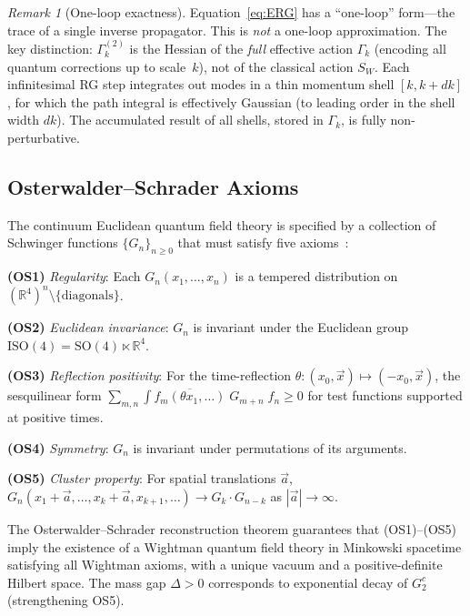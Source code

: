 \documentclass[12pt,a4paper]{article}
\theoremstyle{plain}
\theoremstyle{definition}
\theoremstyle{remark}
\newtheorem{remark}[theorem]{Remark}
\begin{document}
\begin{remark}[One-loop exactness]\label{rem:oneloop}
Equation~\eqref{eq:ERG} has a ``one-loop'' form---the trace of a single inverse propagator. This is \emph{not} a one-loop approximation. The key distinction: $\Gamma_k^{(2)}$ is the Hessian of the \emph{full} effective action $\Gamma_k$ (encoding all quantum corrections up to scale~$k$), not of the classical action $S_W$. Each infinitesimal RG step integrates out modes in a thin momentum shell $[k,k+dk]$, for which the path integral is effectively Gaussian (to leading order in the shell width $dk$). The accumulated result of all shells, stored in $\Gamma_k$, is fully non-perturbative.
\end{remark}

\subsection{Osterwalder--Schrader Axioms}\label{sec:OSaxioms}

The continuum Euclidean quantum field theory is specified by a collection of Schwinger functions $\{G_n\}_{n\geq 0}$ that must satisfy five axioms~\cite{OsterwalderSchrader1973,OsterwalderSchrader1975}:

\noindent\textbf{(OS1)} \textit{Regularity}: Each $G_n(x_1,\ldots,x_n)$ is a tempered distribution on $(\mathbb{R}^4)^n\setminus\{\text{diagonals}\}$.

\noindent\textbf{(OS2)} \textit{Euclidean invariance}: $G_n$ is invariant under the Euclidean group $\mathrm{ISO}(4)=\mathrm{SO}(4)\ltimes\mathbb{R}^4$.

\noindent\textbf{(OS3)} \textit{Reflection positivity}: For the time-reflection $\theta:(x_0,\vec{x})\mapsto(-x_0,\vec{x})$, the sesquilinear form $\sum_{m,n}\int\overline{f_m(\theta x_1,\ldots)}\;G_{m+n}\;f_n\geq 0$ for test functions supported at positive times.

\noindent\textbf{(OS4)} \textit{Symmetry}: $G_n$ is invariant under permutations of its arguments.

\noindent\textbf{(OS5)} \textit{Cluster property}: For spatial translations $\vec{a}$, $G_n(x_1+\vec{a},\ldots,x_k+\vec{a},x_{k+1},\ldots)\to G_k\cdot G_{n-k}$ as $|\vec{a}|\to\infty$.

The Osterwalder--Schrader reconstruction theorem guarantees that (OS1)--(OS5) imply the existence of a Wightman quantum field theory in Minkowski spacetime satisfying all Wightman axioms, with a unique vacuum and a positive-definite Hilbert space. The mass gap $\Delta>0$ corresponds to exponential decay of $G_2^c$ (strengthening OS5).
\end{document}
